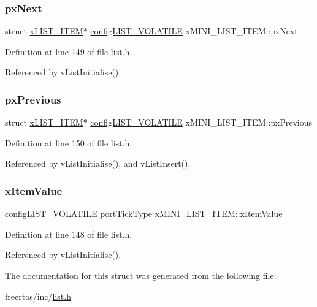 \subsubsection{\texorpdfstring{px\+Next}{pxNext}}
{\footnotesize\ttfamily struct \hyperlink{structxLIST__ITEM}{x\+L\+I\+S\+T\+\_\+\+I\+T\+EM}$\ast$ \hyperlink{list_8h_a2d5de557c5561c8980d1bf51d87d8cba}{config\+L\+I\+S\+T\+\_\+\+V\+O\+L\+A\+T\+I\+LE} x\+M\+I\+N\+I\+\_\+\+L\+I\+S\+T\+\_\+\+I\+T\+E\+M\+::px\+Next}



Definition at line 149 of file list.\+h.



Referenced by v\+List\+Initialise().

\mbox{\label{structxMINI__LIST__ITEM_a732c666bb97560eb1b094a2c411269ab}} 
\subsubsection{\texorpdfstring{px\+Previous}{pxPrevious}}
{\footnotesize\ttfamily struct \hyperlink{structxLIST__ITEM}{x\+L\+I\+S\+T\+\_\+\+I\+T\+EM}$\ast$ \hyperlink{list_8h_a2d5de557c5561c8980d1bf51d87d8cba}{config\+L\+I\+S\+T\+\_\+\+V\+O\+L\+A\+T\+I\+LE} x\+M\+I\+N\+I\+\_\+\+L\+I\+S\+T\+\_\+\+I\+T\+E\+M\+::px\+Previous}



Definition at line 150 of file list.\+h.



Referenced by v\+List\+Initialise(), and v\+List\+Insert().

\mbox{\label{structxMINI__LIST__ITEM_a15a3f1840e5f2a5f59c7f06a355f6e82}} 
\subsubsection{\texorpdfstring{x\+Item\+Value}{xItemValue}}
{\footnotesize\ttfamily \hyperlink{list_8h_a2d5de557c5561c8980d1bf51d87d8cba}{config\+L\+I\+S\+T\+\_\+\+V\+O\+L\+A\+T\+I\+LE} \hyperlink{portmacro_8h_a4d746b2ff8fafc490b764c66411ec457}{port\+Tick\+Type} x\+M\+I\+N\+I\+\_\+\+L\+I\+S\+T\+\_\+\+I\+T\+E\+M\+::x\+Item\+Value}



Definition at line 148 of file list.\+h.



Referenced by v\+List\+Initialise().



The documentation for this struct was generated from the following file\+:\begin{DoxyCompactItemize}
\item 
freertos/inc/\hyperlink{list_8h}{list.\+h}\end{DoxyCompactItemize}
